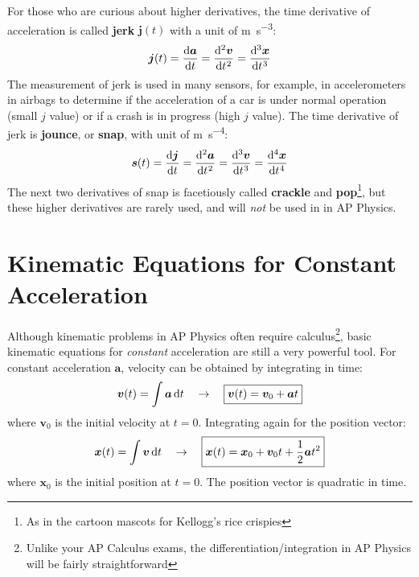 \documentclass{../../../oss-handout}
\begin{document}
For those who are curious about higher derivatives, the time derivative of
acceleration is called \textbf{jerk} $\bm{j}(t)$ with a unit of
\si{\metre\per\second\cubed}:
\begin{equation}
  \bm{j}(t)=\diff{\bm{a}}t=\diff[2]{\bm{v}}t=\diff[3]{\bm{x}}t
\end{equation}
The measurement of jerk is used in many sensors, for example, in accelerometers
in airbags to determine if the acceleration of a car is under normal operation
(small $j$ value) or if a crash is in progress (high $j$ value). The time
derivative of jerk is \textbf{jounce}, or \textbf{snap}, with unit of
\si{\metre\per\second^4}:
\begin{equation}
  \bm{s}(t)=\diff{\bm{j}}t=\diff[2]{\bm{a}}t=\diff[3]{\bm{v}}t=\diff[4]{\bm{x}}t
\end{equation}
The next two derivatives of snap is facetiously called \textbf{crackle} and
\textbf{pop}\footnote{As in the cartoon mascots for Kellogg's rice crispies},
but these higher derivatives are rarely used, and will \emph{not} be used in
in AP Physics.



\section{Kinematic Equations for Constant Acceleration}

Although kinematic problems in AP Physics often require calculus\footnote{Unlike
  your AP Calculus exams, the differentiation/integration in AP Physics will be
  fairly straightforward}, basic kinematic equations for \emph{constant}
acceleration are still a very powerful tool. For constant acceleration
$\bm{a}$, velocity can be obtained by integrating in time:
\begin{equation}
  \bm{v}(t)=\int\bm{a}\dl t\quad\rightarrow\quad
  \boxed{\bm{v}(t)=\bm{v}_0+\bm{a}t}
  \label{eq:big5-1}
\end{equation}
where $\bm{v}_0$ is the initial velocity at $t=0$. Integrating again for the
position vector:
\begin{equation}
  \bm{x}(t)=\int \bm{v}\dl t\quad\rightarrow\quad
  \boxed{\bm{x}(t)=\bm{x}_0+\bm{v}_0t+\frac12 \bm{a}t^2}
  \label{eq:big5-2}
\end{equation}
where $\bm{x}_0$ is the initial position at $t=0$. The position vector is
quadratic in time.
\end{document}
